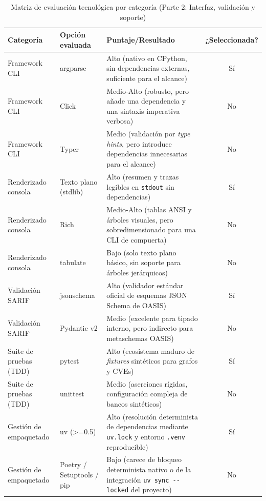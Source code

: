 \begin{table}[H]
\centering
\caption{Matriz de evaluación tecnológica por categoría (Parte 2: Interfaz, validación y soporte)}
\label{p5:tab:evaluacion_tecnologica_categoria_p2}
\small
{}
\begin{tabularx}{\textwidth}{p{3.4cm} p{3.2cm} X c}
\toprule
\textbf{Categoría} & \textbf{Opción evaluada} & \textbf{Puntaje/Resultado} & \textbf{¿Seleccionada?} \\
\midrule
Framework CLI & argparse & Alto (nativo en CPython, sin dependencias externas, suficiente para el alcance) & Sí \\
Framework CLI & Click & Medio-Alto (robusto, pero añade una dependencia y una sintaxis imperativa verbosa) & No \\
Framework CLI & Typer & Medio (validación por \textit{type hints}, pero introduce dependencias innecesarias para el alcance) & No \\
\addlinespace
Renderizado consola & Texto plano (stdlib) & Alto (resumen y trazas legibles en \texttt{stdout} sin dependencias) & Sí \\
Renderizado consola & Rich & Medio-Alto (tablas ANSI y árboles visuales, pero sobredimensionado para una CLI de compuerta) & No \\
Renderizado consola & tabulate & Bajo (solo texto plano básico, sin soporte para árboles jerárquicos) & No \\
\addlinespace
Validación SARIF & jsonschema & Alto (validador estándar oficial de esquemas JSON Schema de OASIS) & Sí \\
Validación SARIF & Pydantic v2 & Medio (excelente para tipado interno, pero indirecto para metaschemas OASIS) & No \\
\addlinespace
Suite de pruebas (TDD) & pytest & Alto (ecosistema maduro de \textit{fixtures} sintéticos para grafos y CVEs) & Sí \\
Suite de pruebas (TDD) & unittest & Medio (aserciones rígidas, configuración compleja de bancos sintéticos) & No \\
\addlinespace
Gestión de empaquetado & uv (>=0.5) & Alto (resolución determinista de dependencias mediante \texttt{uv.\allowbreak lock} y entorno \texttt{.\allowbreak venv} reproducible) & Sí \\
Gestión de empaquetado & Poetry / Setuptools / pip & Bajo (carece de bloqueo determinista nativo o de la integración \texttt{uv sync -\allowbreak -\allowbreak locked} del proyecto) & No \\
\bottomrule
\end{tabularx}
\end{table}

